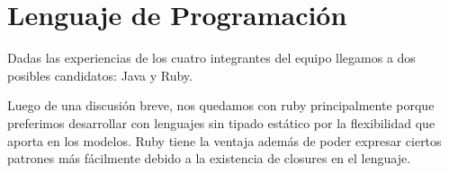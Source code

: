 \section{Lenguaje de Programación}

Dadas las experiencias de los cuatro integrantes del equipo llegamos a dos posibles candidatos: Java y Ruby.

Luego de una discusión breve, nos quedamos con ruby principalmente porque preferimos desarrollar con lenguajes sin tipado estático por la flexibilidad que aporta en los modelos.  Ruby tiene la ventaja además de poder expresar ciertos patrones más fácilmente debido a la existencia de closures en el lenguaje.